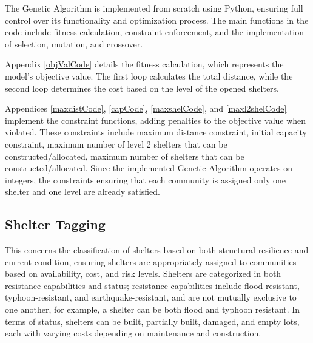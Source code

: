 	The Genetic Algorithm is implemented from scratch using Python, ensuring full control over its functionality and optimization process. The main functions in the code include fitness calculation, constraint enforcement, and the implementation of selection, mutation, and crossover.
	
	Appendix \ref{objValCode} details the fitness calculation, which represents the model's objective value. The first loop calculates the total distance, while the second loop determines the cost based on the level of the opened shelters.
	
	Appendices \ref{maxdistCode}, \ref{capCode}, \ref{maxshelCode}, and \ref{maxl2shelCode} implement the constraint functions, adding penalties to the objective value when violated. These constraints include maximum distance constraint, initial capacity constraint, maximum number of level 2 shelters that can be constructed/allocated, maximum number of shelters that can be constructed/allocated. Since the implemented Genetic Algorithm operates on integers, the constraints ensuring that each community is assigned only one shelter and one level are already satisfied.
	
\subsection{Shelter Tagging}
	This concerns the classification of shelters based on both structural resilience and current condition, ensuring shelters are appropriately assigned to communities based on availability, cost, and risk levels. Shelters are categorized in both resistance capabilities and status; resistance capabilities include flood-resistant, typhoon-resistant, and earthquake-resistant, and are not mutually exclusive to one another, for example, a shelter can be both flood and typhoon resistant. In terms of status, shelters can be built, partially built, damaged, and empty lots, each with varying costs depending on maintenance and construction.
	
